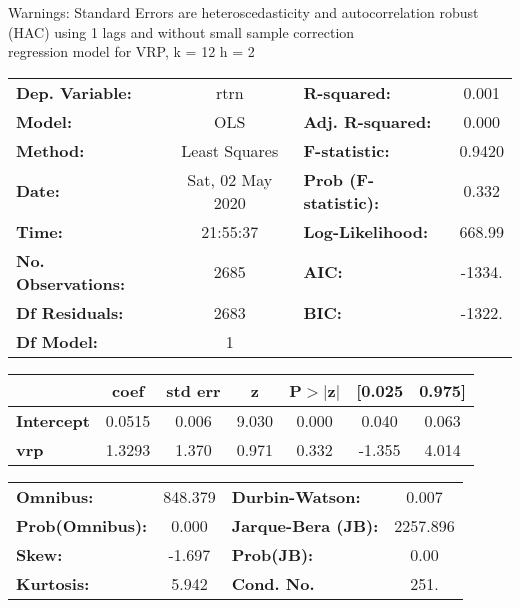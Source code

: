 Warnings: \newline
 [1] Standard Errors are heteroscedasticity and autocorrelation robust (HAC) using 1 lags and without small sample correction\\ 

regression model for VRP, k = 12 h = 2\begin{center}
\begin{tabular}{lclc}
\toprule
\textbf{Dep. Variable:}    &       rtrn       & \textbf{  R-squared:         } &     0.001   \\
\textbf{Model:}            &       OLS        & \textbf{  Adj. R-squared:    } &     0.000   \\
\textbf{Method:}           &  Least Squares   & \textbf{  F-statistic:       } &    0.9420   \\
\textbf{Date:}             & Sat, 02 May 2020 & \textbf{  Prob (F-statistic):} &    0.332    \\
\textbf{Time:}             &     21:55:37     & \textbf{  Log-Likelihood:    } &    668.99   \\
\textbf{No. Observations:} &        2685      & \textbf{  AIC:               } &    -1334.   \\
\textbf{Df Residuals:}     &        2683      & \textbf{  BIC:               } &    -1322.   \\
\textbf{Df Model:}         &           1      & \textbf{                     } &             \\
\bottomrule
\end{tabular}
\begin{tabular}{lcccccc}
                   & \textbf{coef} & \textbf{std err} & \textbf{z} & \textbf{P$> |$z$|$} & \textbf{[0.025} & \textbf{0.975]}  \\
\midrule
\textbf{Intercept} &       0.0515  &        0.006     &     9.030  &         0.000        &        0.040    &        0.063     \\
\textbf{vrp}       &       1.3293  &        1.370     &     0.971  &         0.332        &       -1.355    &        4.014     \\
\bottomrule
\end{tabular}
\begin{tabular}{lclc}
\textbf{Omnibus:}       & 848.379 & \textbf{  Durbin-Watson:     } &    0.007  \\
\textbf{Prob(Omnibus):} &   0.000 & \textbf{  Jarque-Bera (JB):  } & 2257.896  \\
\textbf{Skew:}          &  -1.697 & \textbf{  Prob(JB):          } &     0.00  \\
\textbf{Kurtosis:}      &   5.942 & \textbf{  Cond. No.          } &     251.  \\
\bottomrule
\end{tabular}
\end{center}


